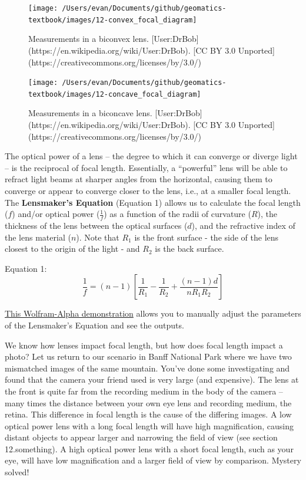 \documentclass[
]{book}
\begin{document}
\begin{figure}
\texttt{[image: /Users/evan/Documents/github/geomatics-textbook/images/12-convex\_focal\_diagram]} \caption{Measurements in a biconvex lens. [User:DrBob](https://en.wikipedia.org/wiki/User:DrBob). [CC BY 3.0 Unported](https://creativecommons.org/licenses/by/3.0/)}\label{fig:12-convex-focal-diagram}
\end{figure}

\begin{figure}
\texttt{[image: /Users/evan/Documents/github/geomatics-textbook/images/12-concave\_focal\_diagram]} \caption{Measurements in a biconcave lens. [User:DrBob](https://en.wikipedia.org/wiki/User:DrBob). [CC BY 3.0 Unported](https://creativecommons.org/licenses/by/3.0/)}\label{fig:12-concave-focal-diagram}
\end{figure}

The optical power of a lens -- the degree to which it can converge or diverge light -- is the reciprocal of focal length. Essentially, a ``powerful'' lens will be able to refract light beams at sharper angles from the horizontal, causing them to converge or appear to converge closer to the lens, i.e., at a smaller focal length. The \textbf{Lensmaker's Equation} (Equation 1) allows us to calculate the focal length (\(f\)) and/or optical power (\(\frac{1}{f}\)) as a function of the radii of curvature (\(R\)), the thickness of the lens between the optical surfaces (\(d\)), and the refractive index of the lens material (\(n\)). Note that \(R_1\) is the front surface - the side of the lens closest to the origin of the light - and \(R_2\) is the back surface.

Equation 1: \[\frac{1}{f} = (n-1)[\frac{1}{R_1} - \frac{1}{R_2} + \frac{(n-1)d}{nR_1R_2}]\]

\href{https://demonstrations.wolfram.com/LensmakersEquation/\#embed}{This Wolfram-Alpha demonstration} allows you to manually adjust the parameters of the Lensmaker's Equation and see the outputs.

We know how lenses impact focal length, but how does focal length impact a photo? Let us return to our scenario in Banff National Park where we have two mismatched images of the same mountain. You've done some investigating and found that the camera your friend used is very large (and expensive). The lens at the front is quite far from the recording medium in the body of the camera -- many times the distance between your own eye lens and recording medium, the retina. This difference in focal length is the cause of the differing images. A low optical power lens with a long focal length will have high magnification, causing distant objects to appear larger and narrowing the field of view (see section 12.something). A high optical power lens with a short focal length, such as your eye, will have low magnification and a larger field of view by comparison. Mystery solved!
\end{document}
